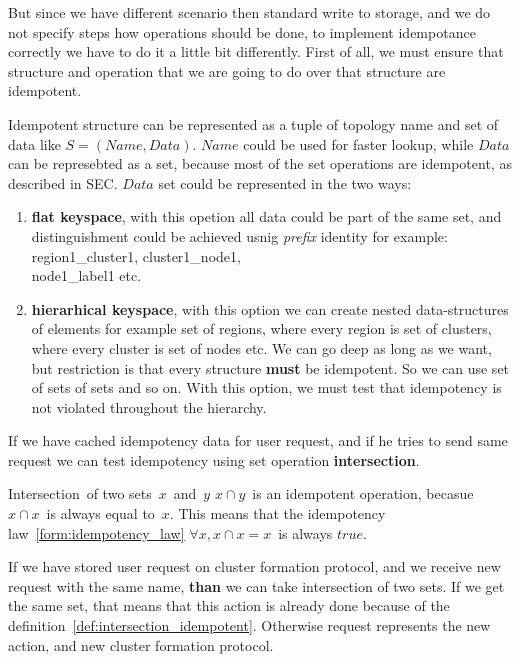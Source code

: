 But since we have different scenario then standard write to storage, and we do not specify steps how operations should be done, to implement idempotance correctly we have to do it a little bit differently. First of all, we must ensure that structure and operation that we are going to do over that structure are idempotent.

Idempotent structure can be represented as a tuple of topology name and set of data like $S=(Name, Data)$. $Name$ could be used for faster lookup, while $Data$ can be represebted as a set, because most of the set operations are idempotent, as described in SEC. $Data$ set could be represented in the two ways:

\begin{enumerate}[start=1,label={(\bfseries \arabic*)}]
	\item \textbf{flat keyspace}, with this opetion all data could be part of the same set, and distinguishment could be achieved usnig \textit{prefix} identity for example: region1\_cluster1, cluster1\_node1, \\node1\_label1 etc.
	\item \textbf{hierarhical keyspace}, with this option we can create nested data-structures of elements for example set of regions, where every region is set of clusters, where every cluster is set of nodes etc. We can go deep as long as we want, but restriction is that every structure \textbf{must} be idempotent. So we can use set of sets of sets and so on. With this option, we must test that idempotency is not violated throughout the hierarchy.
\end{enumerate}

If we have cached idempotency data for user request, and if he tries to send same request we can test idempotency using set operation \textbf{intersection}.

\begin{definition}\label{def:intersection_idempotent}
	Intersection of two sets $x$ and $y$ $x \cap y$ is an idempotent operation, becasue $x \cap x$ is always equal to $x$. This means that the idempotency law~\ref{form:idempotency_law} $\forall x, x \cap x = x$ is always $true$.
\end{definition}

If we have stored user request on cluster formation protocol, and we receive new request with the same name, \textbf{than} we can take intersection of two sets. If we get the same set, that means that this action is already done because of the definition~\ref{def:intersection_idempotent}. Otherwise request represents the new action, and new cluster formation protocol. 


